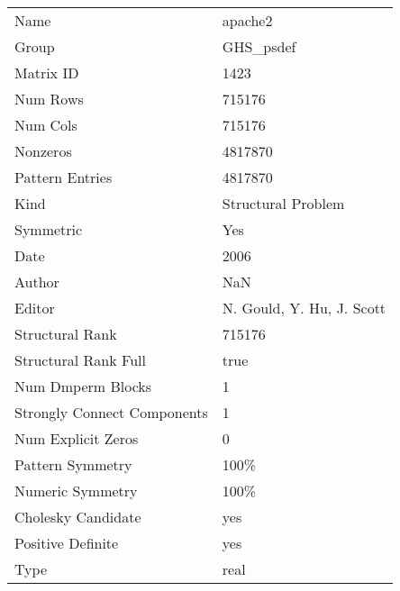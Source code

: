\begin{tabular}{ll}
\midrule
                       Name &                   apache2 \\
                      Group &                 GHS\_psdef \\
                  Matrix ID &                      1423 \\
                   Num Rows &                    715176 \\
                   Num Cols &                    715176 \\
                   Nonzeros &                   4817870 \\
            Pattern Entries &                   4817870 \\
                       Kind &        Structural Problem \\
                  Symmetric &                       Yes \\
                       Date &                      2006 \\
                     Author &                       NaN \\
                     Editor & N. Gould, Y. Hu, J. Scott \\
            Structural Rank &                    715176 \\
       Structural Rank Full &                      true \\
          Num Dmperm Blocks &                         1 \\
Strongly Connect Components &                         1 \\
         Num Explicit Zeros &                         0 \\
           Pattern Symmetry &                      100\% \\
           Numeric Symmetry &                      100\% \\
         Cholesky Candidate &                       yes \\
          Positive Definite &                       yes \\
                       Type &                      real \\
\bottomrule
\end{tabular}
